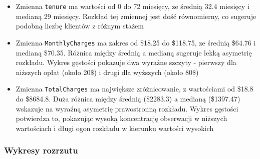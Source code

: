 \documentclass[12pt, a4paper]{article}\usepackage[]{graphicx}\usepackage[]{xcolor}
\begin{document}
\begin{itemize}
  \item Zmienna \texttt{tenure} ma wartości od 0 do 72 miesięcy, ze średnią 32.4 miesięcy i medianą 29 miesięcy. Rozkład tej zmiennej jest dość równomierny, co sugeruje podobną liczbę klientów z różnym stażem
  
  \item Zmienna \texttt{MonthlyCharges} ma zakres od \$18.25 do \$118.75, ze średnią \$64.76 i medianą \$70.35. Różnica między średnią a medianą sugeruje lekką asymetrię rozkładu. Wykres gęstości pokazuje dwa wyraźne szczyty - pierwszy dla niższych opłat (około 20\$) i drugi dla wyższych (około 80\$)
  
  \item Zmienna \texttt{TotalCharges} ma największe zróżnicowanie, z wartościami od \$18.8 do \$8684.8. Duża różnica między średnią (\$2283.3) a medianą (\$1397.47) wskazuje na wyraźną asymetrię prawostronną rozkładu. Wykres gęstości potwierdza to, pokazując wysoką koncentrację obserwacji w niższych wartościach i długi ogon rozkładu w kierunku wartości wysokich
\end{itemize}



\newpage
\subsubsection{Wykresy rozrzutu}
\end{document}
